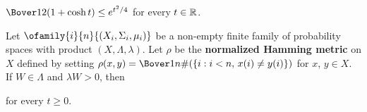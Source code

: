  $\Bover12(1+\cosh t)\le e^{t^2/4}$ for every $t\in\Bbb R$.


 Let
$\ofamily{i}{n}{(X_i,\Sigma_i,\mu_i)}$ be a non-empty finite family of
probability
spaces with product $(X,\Lambda,\lambda)$.   Let $\rho$ be the {\bf
normalized Hamming metric} on
$X$ defined by setting $\rho(x,y)=\Bover1n\#(\{i:i<n,\,x(i)\ne y(i)\})$
for $x$, $y\in X$.   If $W\in\Lambda$ and $\lambda W>0$, then


\noindent for every $t\ge 0$.

